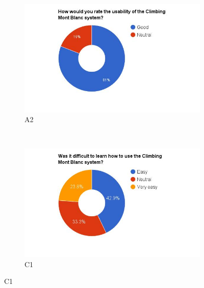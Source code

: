 \begin{figure}
    \centering
    \begin{subfigure}[h]{0.48\textwidth}
        \centerline{\includegraphics[width=1.5\textwidth]{results/usability_cmb.jpg}}
        \caption{A2}
        \label{fig:cmb-usability}
    \end{subfigure}
    ~ %
    \hfill
    \begin{subfigure}[h]{0.48\textwidth}
        \centerline{\includegraphics[width=1.5\textwidth]{results/learn_cmb.jpg}}
        \caption{C1}
        \label{fig:cmb-learn}
    \end{subfigure}


\end{figure}
